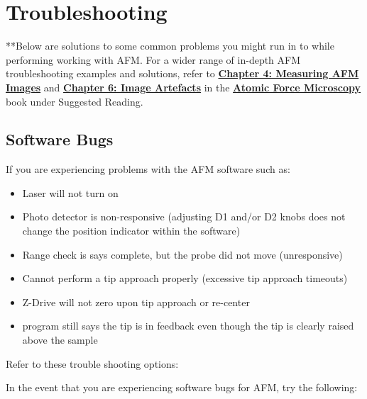 \documentclass{../lab}
\begin{document}
\section{Troubleshooting}
\label{sec:Troubleshooting}

**Below are solutions to some common problems you might run in to while performing working with AFM.  For a wider range of in-depth AFM troubleshooting examples and solutions, refer to \href{http://experimentationlab.berkeley.edu/afm-book}{\textbf{Chapter 4: Measuring AFM Images}} and \href{http://experimentationlab.berkeley.edu/afm-book}{\textbf{Chapter 6: Image Artefacts}} in the \href{http://experimentationlab.berkeley.edu/afm-book}{\textbf{Atomic Force Microscopy}} book under Suggested Reading.

\subsection{Software Bugs}

If you are experiencing problems with the AFM software such as:

\begin{itemize}
    \item Laser will not turn on

    \item Photo detector is non-responsive (adjusting D1 and/or D2 knobs does not change the position indicator within the software)

    \item Range check is says complete, but the probe did not move (unresponsive)

    \item Cannot perform a tip approach properly (excessive tip approach timeouts)

    \item Z-Drive will not zero upon tip approach or re-center

    \item program still says the tip is in feedback even though the tip is clearly raised above the sample

\end{itemize}

Refer to these trouble shooting options:

In the event that you are experiencing software bugs for AFM, try the following:
\end{document}
